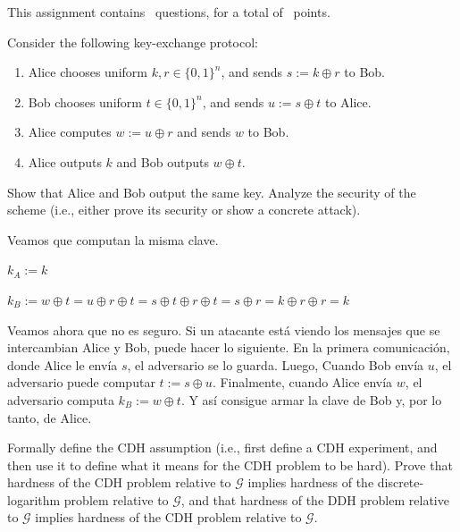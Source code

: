 \documentclass[12pt,addpoints,answers]{exam}
\begin{document}
\noindent This assignment contains \numquestions\ questions,
for a total of \numpoints \ points.

\bigskip

\begin{questions}

\question[10] Consider the following key-exchange protocol:
\begin{enumerate}[label=(\alph*)]
    \item Alice chooses uniform $k,r\in\{0,1\}^n$, and sends $s:=k\oplus r$ to Bob.
    \item Bob chooses uniform $t\in\{0,1\}^n$, and sends $u:=s\oplus t$ to Alice.
    \item Alice computes $w:=u\oplus r$ and sends $w$ to Bob.
    \item Alice outputs $k$ and Bob outputs $w\oplus t$.
\end{enumerate}
Show that Alice and Bob output the same key. Analyze the security of the scheme (i.e., either prove its security or show a concrete attack).

\begin{solution}
  Veamos que computan la misma clave. 

  $k_A := k$

  $k_B := w \oplus t = u \oplus r \oplus t = s \oplus t \oplus r \oplus t = s \oplus r = k \oplus r \oplus r = k$ 

  Veamos ahora que no es seguro. Si un atacante está viendo los mensajes que se intercambian Alice y Bob, puede hacer lo siguiente. 
  En la primera comunicación, donde Alice le envía $s$, el adversario se lo guarda.
  Luego, Cuando Bob envía $u$, el adversario puede computar $t := s \oplus u$.
  Finalmente, cuando Alice envía $w$, el adversario computa $k_B := w \oplus t$. Y así consigue armar la clave de Bob y, por lo tanto, de Alice.

\end{solution}

\question[10] Formally define the CDH assumption (i.e., first define a CDH experiment, and then use it to define what it means for the CDH problem to be hard). Prove that hardness of the CDH problem relative to $\mathcal{G}$ implies hardness of the discrete-logarithm problem relative to $\mathcal{G}$, and that hardness of the DDH problem relative to $\mathcal{G}$ implies hardness of the CDH problem relative to $\mathcal{G}$.
\begin{solution}


\end{solution}
\end{questions}
\end{document}
